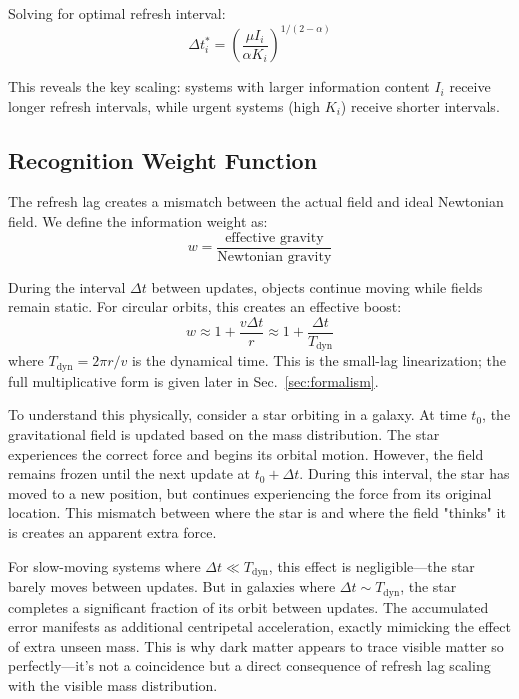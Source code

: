 \documentclass[twocolumn,prd,amsmath,amssymb,aps,superscriptaddress,nofootinbib]{revtex4-2}
\begin{document}
Solving for optimal refresh interval:
\begin{equation}
\Delta t_i^* = \left(\frac{\mu I_i}{\alpha K_i}\right)^{1/(2-\alpha)}
\end{equation}

This reveals the key scaling: systems with larger information content $I_i$ receive longer refresh intervals, while urgent systems (high $K_i$) receive shorter intervals.

\subsection{Recognition Weight Function}

The refresh lag creates a mismatch between the actual field and ideal Newtonian field. We define the information weight as:
\begin{equation}
w = \frac{\text{effective gravity}}{\text{Newtonian gravity}}
\end{equation}

During the interval $\Delta t$ between updates, objects continue moving while fields remain static. For circular orbits, this creates an effective boost:
\begin{equation}
w \approx 1 + \frac{v \Delta t}{r} \approx 1 + \frac{\Delta t}{T_{\text{dyn}}}
\end{equation}
where $T_{\text{dyn}} = 2\pi r/v$ is the dynamical time.
This is the small-lag linearization; the full multiplicative form is given later in Sec.~\ref{sec:formalism}.

To understand this physically, consider a star orbiting in a galaxy. At time $t_0$, the gravitational field is updated based on the mass distribution. The star experiences the correct force and begins its orbital motion. However, the field remains frozen until the next update at $t_0 + \Delta t$. During this interval, the star has moved to a new position, but continues experiencing the force from its original location. This mismatch between where the star is and where the field "thinks" it is creates an apparent extra force.

For slow-moving systems where $\Delta t \ll T_{\text{dyn}}$, this effect is negligible---the star barely moves between updates. But in galaxies where $\Delta t \sim T_{\text{dyn}}$, the star completes a significant fraction of its orbit between updates. The accumulated error manifests as additional centripetal acceleration, exactly mimicking the effect of extra unseen mass. This is why dark matter appears to trace visible matter so perfectly---it's not a coincidence but a direct consequence of refresh lag scaling with the visible mass distribution.
\end{document}
